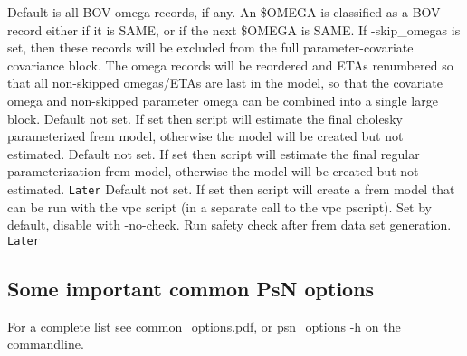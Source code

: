 \begin{optionlist}
{}
Default is all BOV omega records, if any.
An \$OMEGA is classified as a BOV record either if it is SAME, or if the next \$OMEGA is SAME. 
If -skip\_omegas is set,
then these records will be excluded from the full parameter-covariate covariance block.
The omega records will be reordered and ETAs renumbered so that all non-skipped
omegas/ETAs are last in the model, so that the covariate omega and non-skipped parameter omega
can be combined into a single large block.
\nextopt
{}
Default not set.
If set then script will estimate
the final cholesky parameterized frem model, otherwise the model will be
created but not estimated.
\nextopt
{}
Default not set.
If set then script will estimate
the final regular parameterization frem model, otherwise the model will be
created but not estimated.
\nextopt
{}
{\Large \texttt{Later}}
Default not set. If set then script will create a frem model that can be run with the vpc script (in a separate call to the vpc pscript).  
\nextopt
{}
Set by default, disable with -no-check. Run safety check after frem data set generation. 
\nextopt
{}
{\Large \texttt{Later}}

\end{optionlist}
\subsection{Some important common PsN options}
For a complete list see common\_options.pdf, 
or psn\_options -h on the commandline.



